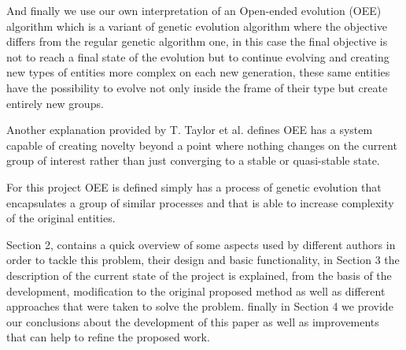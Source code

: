 \documentclass[conference]{IEEEtran}
\begin{document}
And finally we use our own interpretation of an Open-ended evolution (OEE) 
algorithm which is a variant of genetic evolution algorithm where
the objective differs from the regular genetic algorithm one, in this case the
final objective is not to reach a final state of the evolution but to continue
evolving and creating new types of entities more complex on each new generation,
these same entities have the possibility to evolve not only inside the frame of
their type but create entirely new groups. \cite{Standish2003}

Another explanation provided by T. Taylor et al. \cite{Taylor2016,Taylor}
defines OEE has a system capable of creating novelty beyond a point where
nothing changes on the current group of interest rather than just converging to
a stable or quasi-stable state.

For this project OEE is defined simply has a process of genetic evolution that
encapsulates a group of similar processes and that is able to increase complexity
 of the original entities.




Section 2, contains a quick overview of some aspects used by different authors
in order to tackle this problem, their design and basic functionality, in
Section 3 the description of the current state of the project is explained, from
the basis of the development, modification to the original proposed method as 
well as different approaches that were taken to solve the problem.
finally in Section 4 we provide our conclusions about the development of this
paper as well as improvements that can help to refine the proposed work. 

 
\end{document}
